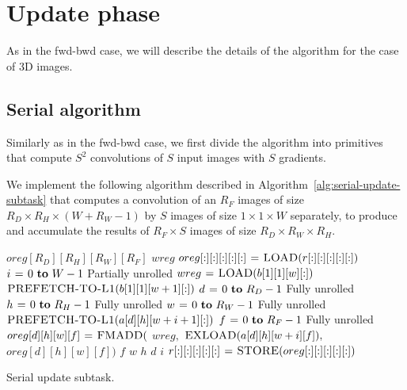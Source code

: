 \section{Update phase}

  As in the fwd-bwd case, we will describe the details of the
  algorithm for the case of 3D images.
  \subsection{Serial algorithm}

  Similarly as in the fwd-bwd case, we first divide the algorithm into
  primitives that compute $S^2$ convolutions of $S$ input images with
  $S$ gradients.

  We implement the following algorithm described in
  Algorithm~\ref{alg:serial-update-subtask} that computes a
  convolution of an $R_F$ images of size $R_D \times R_H \times (W + R_W
  - 1)$ by $S$ images of size $1 \times 1 \times W$ separately, to
  produce and accumulate the results of $R_F \times S$ images of size
  $R_D \times R_W \times R_H$.

  \begin{algorithm}
    {\footnotesize
      \begin{codebox}
        \li {} $oreg[R_D][R_H][R_W][R_F]$
        \li {} $wreg$
        \li $oreg[:][:][:][:][:] \mathrel{\hspace{1pt}=\hspace{1pt}} \textnormal{\scshape LOAD}(r[:][:][:][:][:])$
        \li \For $i \gets 0 \To W-1$ \Comment Partially unrolled
        \li   \Do $wreg \mathrel{\hspace{1pt}=\hspace{1pt}} \textnormal{\scshape LOAD}(b[1][1][w][:])$
        \li       $\textnormal{\scshape PREFETCH-TO-L1}(b[1][1][w+1][:])$
        \li   \For $d \gets 0 \To R_D-1$ \Comment Fully unrolled
        \li   \Do \For $h \gets 0 \To R_H-1$  \Comment Fully unrolled
        \li   \Do \For $w \gets 0 \To R_W-1$  \Comment Fully unrolled
        \li       \Do $\textnormal{\scshape PREFETCH-TO-L1}(a[d][h][w+i+1][:])$
        \li       \For $f \gets 0 \To R_F-1$   \Comment Fully unrolled
        \li   \Do $oreg[d][h][w][f] \mathrel{\hspace{1pt}=\hspace{1pt}} \textnormal{\scshape FMADD}($
        \li   \Do $wreg,$
        \li       $\textnormal{\scshape EXLOAD}(a[d][h][w+i][f]),$
        \li       $oreg[d][h][w][f])$
        \End
        \End \li {} $f$
        \End \li {} $w$
        \End \li {} $h$
        \End \li {} $d$
        \End \li {} $i$
        \li $r[:][:][:][:][:] \mathrel{\hspace{1pt}=\hspace{1pt}} \textnormal{\scshape STORE}(oreg[:][:][:][:][:])$
      \end{codebox}
    \caption{Serial update subtask.}
    \label{alg:serial-update-subtask}
    }
  \end{algorithm}

